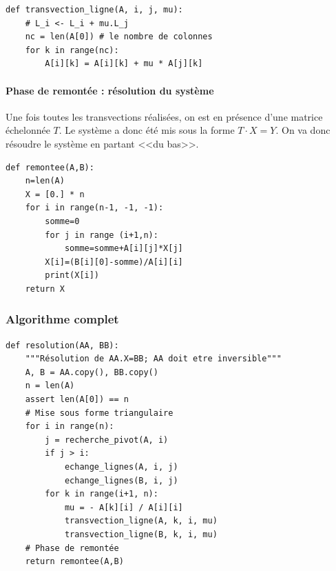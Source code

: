 \begin{lstlisting}
def transvection_ligne(A, i, j, mu):
    # L_i <- L_i + mu.L_j 
    nc = len(A[0]) # le nombre de colonnes
    for k in range(nc):
        A[i][k] = A[i][k] + mu * A[j][k]
\end{lstlisting}

\paragraph*{Phase de remontée : résolution du système}
Une fois toutes les transvections réalisées, on est en présence d'une matrice échelonnée $T$. Le système a donc été mis sous la forme $T\cdot X = Y$. On va donc résoudre le système en partant <<du bas>>.

\begin{lstlisting}
def remontee(A,B):
    n=len(A)
    X = [0.] * n
    for i in range(n-1, -1, -1):
        somme=0
        for j in range (i+1,n):
            somme=somme+A[i][j]*X[j]
        X[i]=(B[i][0]-somme)/A[i][i]
        print(X[i])
    return X
\end{lstlisting}

 

\subsubsection{Algorithme complet}

\begin{lstlisting}
def resolution(AA, BB):
    """Résolution de AA.X=BB; AA doit etre inversible"""
    A, B = AA.copy(), BB.copy()
    n = len(A)
    assert len(A[0]) == n
    # Mise sous forme triangulaire
    for i in range(n):
        j = recherche_pivot(A, i)
        if j > i:
            echange_lignes(A, i, j)
            echange_lignes(B, i, j)
        for k in range(i+1, n):
            mu = - A[k][i] / A[i][i]
            transvection_ligne(A, k, i, mu)
            transvection_ligne(B, k, i, mu)
    # Phase de remontée
    return remontee(A,B)
\end{lstlisting}

%
%

